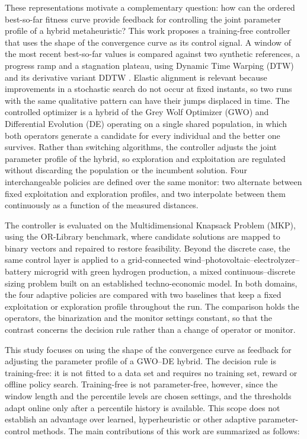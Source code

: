 These representations motivate a complementary question: how can the ordered best-so-far fitness curve provide feedback for controlling the joint parameter profile of a hybrid metaheuristic? This work proposes a training-free controller that uses the shape of the convergence curve as its control signal. A window of the most recent best-so-far values is compared against two synthetic references, a progress ramp and a stagnation plateau, using Dynamic Time Warping (DTW) \cite{berndt1994using} and its derivative variant DDTW \cite{keogh2001derivative}. Elastic alignment is relevant because improvements in a stochastic search do not occur at fixed instants, so two runs with the same qualitative pattern can have their jumps displaced in time. The controlled optimizer is a hybrid of the Grey Wolf Optimizer (GWO) and Differential Evolution (DE) operating on a single shared population, in which both operators generate a candidate for every individual and the better one survives. Rather than switching algorithms, the controller adjusts the joint parameter profile of the hybrid, so exploration and exploitation are regulated without discarding the population or the incumbent solution. Four interchangeable policies are defined over the same monitor: two alternate between fixed exploitation and exploration profiles, and two interpolate between them continuously as a function of the measured distances.

The controller is evaluated on the Multidimensional Knapsack Problem (MKP), using the OR-Library benchmark, where candidate solutions are mapped to binary vectors and repaired to restore feasibility. Beyond the discrete case, the same control layer is applied to a grid-connected wind--photovoltaic--electrolyzer--battery microgrid with green hydrogen production, a mixed continuous--discrete sizing problem built on an established techno-economic model. In both domains, the four adaptive policies are compared with two baselines that keep a fixed exploitation or exploration profile throughout the run. The comparison holds the operators, the binarization and the monitor settings constant, so that the contrast concerns the decision rule rather than a change of operator or monitor.

This study focuses on using the shape of the convergence curve as feedback for adjusting the parameter profile of a GWO--DE hybrid. The decision rule is training-free: it is not fitted to a data set and requires no training set, reward or offline policy search. Training-free is not parameter-free, however, since the window length and the percentile levels are chosen settings, and the thresholds adapt online only after a percentile history is available. This scope does not establish an advantage over learned, hyperheuristic or other adaptive parameter-control methods. The main contributions of this work are summarized as follows:

